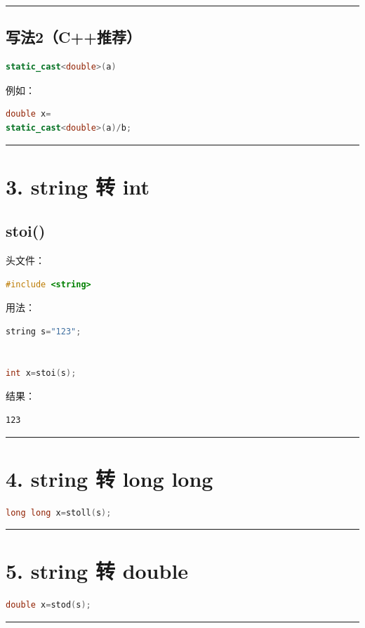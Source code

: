 \documentclass[9pt,twocolumn]{extarticle}
\begin{document}
\noindent\rule{\linewidth}{0.4pt}

\subsection{写法2（C++推荐）}
\begin{lstlisting}[language=C++]
static_cast<double>(a)
\end{lstlisting}
例如：
\begin{lstlisting}[language=C++]
double x=
static_cast<double>(a)/b;
\end{lstlisting}

\noindent\rule{\linewidth}{0.4pt}

\section{3. string 转 int}

\subsection{stoi()}
头文件：
\begin{lstlisting}[language=C++]
#include <string>
\end{lstlisting}
用法：
\begin{lstlisting}[language=C++]
string s="123";


int x=stoi(s);
\end{lstlisting}
结果：
\begin{lstlisting}
123
\end{lstlisting}

\noindent\rule{\linewidth}{0.4pt}

\section{4. string 转 long long}
\begin{lstlisting}[language=C++]
long long x=stoll(s);
\end{lstlisting}

\noindent\rule{\linewidth}{0.4pt}

\section{5. string 转 double}
\begin{lstlisting}[language=C++]
double x=stod(s);
\end{lstlisting}

\noindent\rule{\linewidth}{0.4pt}
\end{document}
